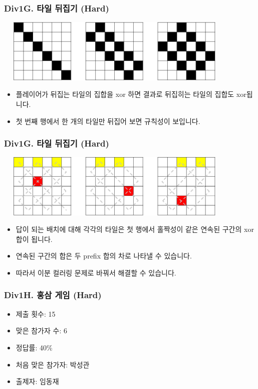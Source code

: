 \documentclass[xetex]{beamer}
\begin{document}
\begin{frame}
  \frametitle{Div1G. 타일 뒤집기 (Hard)}
  \begin{center}
    \includegraphics[width=0.8\textwidth]{tile2-sol1.png}
  \end{center}
  \begin{itemize}
    \item 플레이어가 뒤집는 타일의 집합을 xor 하면 결과로 뒤집히는 타일의 집합도 xor됩니다.
    \item 첫 번째 행에서 한 개의 타일만 뒤집어 보면 규칙성이 보입니다.
  \end{itemize}
\end{frame}

\begin{frame}
  \frametitle{Div1G. 타일 뒤집기 (Hard)}
  \begin{center}
    \includegraphics[width=0.8\textwidth]{tile2-sol2.png}
  \end{center}
  \begin{itemize}
    \item 답이 되는 배치에 대해 각각의 타일은 첫 행에서 홀짝성이 같은 연속된 구간의 xor 합이 됩니다.
    \item 연속된 구간의 합은 두 prefix 합의 차로 나타낼 수 있습니다.
    \item 따라서 이분 컬러링 문제로 바꿔서 해결할 수 있습니다.
  \end{itemize}
\end{frame}

\begin{frame}
  \frametitle{Div1H. 홍삼 게임 (Hard)}
  \begin{itemize}
    \item 제출 횟수: 15
    \item 맞은 참가자 수: 6
    \item 정답률: 40\%
    \item 처음 맞은 참가자: 박성관
    \item 출제자: 임동재
  \end{itemize}
\end{frame}
\end{document}
